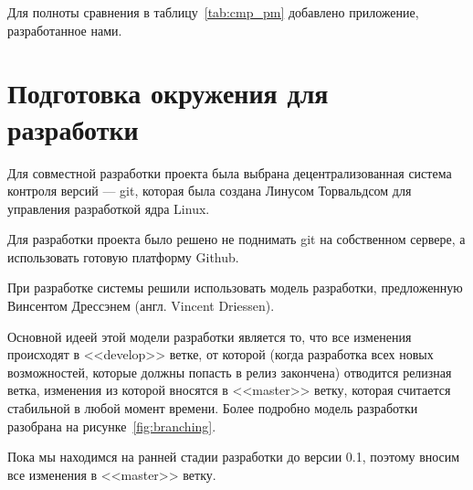 \documentclass[a4paper, 14pt]{extarticle}
\begin{document}
Для полноты сравнения в таблицу~\ref{tab:cmp_pm} добавлено приложение, разработанное нами.

\newpage

\section{Подготовка окружения для разработки}
Для совместной разработки проекта была выбрана децентрализованная система контроля
версий --- git, которая была создана Линусом Торвальдсом для управления разработкой
ядра Linux.~\cite{git_home}

Для разработки проекта было решено не поднимать git на собственном сервере, а использовать
готовую платформу Github.

При разработке системы решили использовать модель разработки, предложенную Винсентом
Дрессэнем (англ. Vincent Driessen).~\cite{git_branching_model}

Основной идеей этой модели разработки является то, что все изменения происходят в
<<develop>> ветке, от которой (когда разработка всех новых возможностей, которые
должны попасть в релиз закончена) отводится релизная ветка, изменения из которой
вносятся в <<master>> ветку, которая считается стабильной в любой момент времени.
Более подробно модель разработки разобрана на рисунке~\ref{fig:branching}.

Пока мы находимся на ранней стадии разработки до версии 0.1, поэтому вносим все изменения
в <<master>> ветку. %
\end{document}
